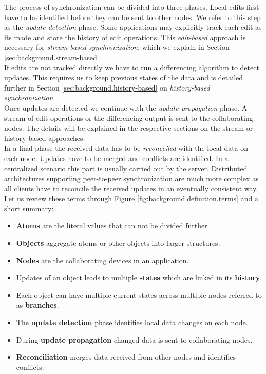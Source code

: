 The process of synchronization can be divided into three phases.
Local edits first have to be identified before they can be sent to other nodes.
We refer to this step as the \emph{update detection} phase.
Some applications may explicitly track each edit as its made and store the history of edit operations.
This \emph{edit-based} approach is necessary for \emph{stream-based synchronization}, which we explain in Section \ref{sec:background.stream-based}.\\
If edits are not tracked directly we have to run a differencing algorithm to detect updates.
This requires us to keep previous states of the data and is detailed further in Section \ref{sec:background.history-based} on \emph{history-based synchronization}.\\
Once updates are detected we continue with the \emph{update propagation} phase.
A stream of edit operations or the differencing output is sent to the collaborating nodes.
The details will be explained in the respective sections on the stream or history based approaches.\\
In a final phase the received data has to be \emph{reconceiled} with the local data on each node.
Updates have to be merged and conflicts are identified.
In a centralized scenario this part is usually carried out by the server.
Distributed architectures supporting peer-to-peer synchronization are much more complex as all clients have to reconcile the received updates in an eventually consistent way.\\

Let us review these terms through Figure \ref{fig:background.definition.terms} and a short summary:

\begin{itemize}
\item \textbf{Atoms} are the literal values that can not be divided further.
\item \textbf{Objects} aggregate atoms or other objects into larger structures.
\item \textbf{Nodes} are the collaborating devices in an application.
\item Updates of an object leads to multiple \textbf{states} which are linked in its \textbf{history}.
\item Each object can have multiple current states across multiple nodes referred to as \textbf{branches}.
\item The \textbf{update detection} phase identifies local data changes on each node.
\item During \textbf{update propagation} changed data is sent to collaborating nodes.
\item \textbf{Reconciliation} merges data received from other nodes and identifies conflicts.
\end{itemize}

